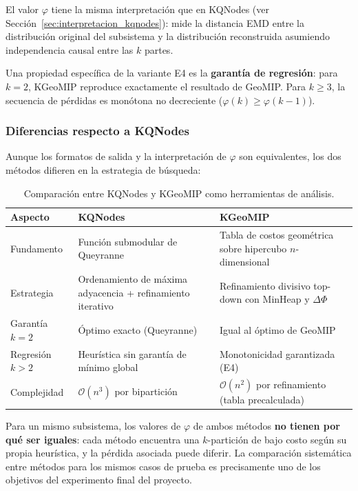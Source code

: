 El valor $\varphi$ tiene la misma interpretación que en KQNodes (ver
Sección~\ref{sec:interpretacion_kqnodes}): mide la distancia EMD entre la distribución
original del subsistema y la distribución reconstruida asumiendo independencia causal
entre las $k$ partes.

Una propiedad específica de la variante E4 es la \textbf{garantía de regresión}:
para $k=2$, KGeoMIP reproduce exactamente el resultado de GeoMIP. Para $k \geq 3$,
la secuencia de pérdidas es monótona no decreciente ($\varphi(k) \geq \varphi(k-1)$).

\subsubsection{Diferencias respecto a KQNodes}

Aunque los formatos de salida y la interpretación de $\varphi$ son equivalentes,
los dos métodos difieren en la estrategia de búsqueda:

\begin{table}[H]
\centering
\begin{tabular}{|l|p{5cm}|p{5cm}|}
\hline
\textbf{Aspecto} & \textbf{KQNodes} & \textbf{KGeoMIP} \\
\hline
Fundamento       & Función submodular de Queyranne & Tabla de costos geométrica sobre hipercubo $n$-dimensional \\
Estrategia       & Ordenamiento de máxima adyacencia + refinamiento iterativo & Refinamiento divisivo top-down con MinHeap y $\Delta\Phi$ \\
Garantía $k=2$  & Óptimo exacto (Queyranne) & Igual al óptimo de GeoMIP \\
Regresión $k>2$ & Heurística sin garantía de mínimo global & Monotonicidad garantizada (E4) \\
Complejidad      & $\mathcal{O}(n^3)$ por bipartición & $\mathcal{O}(n^2)$ por refinamiento (tabla precalculada) \\
\hline
\end{tabular}
\caption{Comparación entre KQNodes y KGeoMIP como herramientas de análisis.}
\label{tab:comparacion_metodos}
\end{table}

Para un mismo subsistema, los valores de $\varphi$ de ambos métodos \textbf{no tienen
por qué ser iguales}: cada método encuentra una $k$-partición de bajo costo según su
propia heurística, y la pérdida asociada puede diferir. La comparación sistemática
entre métodos para los mismos casos de prueba es precisamente uno de los objetivos del
experimento final del proyecto.
